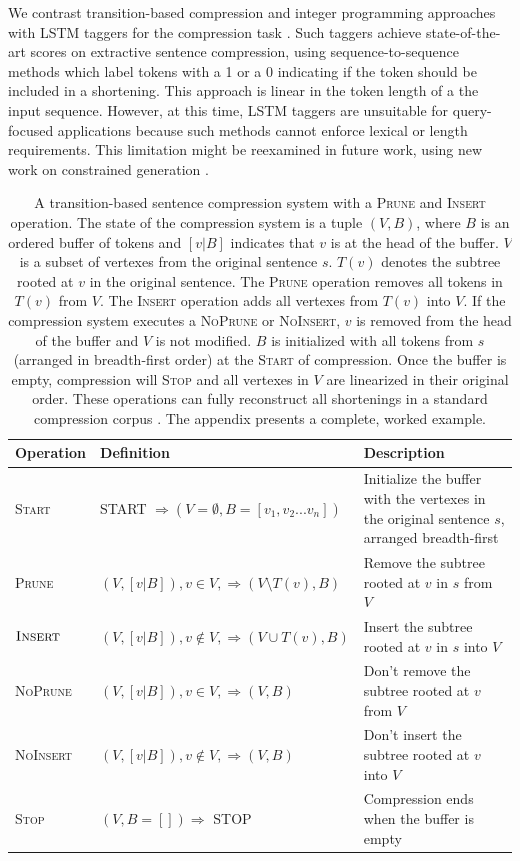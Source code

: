 \documentclass[11pt,a4paper]{article}
\begin{document}
We contrast transition-based compression and integer programming approaches with LSTM taggers for the compression task \cite{filippova2015sentence}. Such taggers achieve state-of-the-art scores on extractive sentence compression, using sequence-to-sequence methods which label tokens with a 1 or a 0 indicating if the token should be included in a shortening. This approach is linear in the token length of a the input sequence. However, at this time, LSTM taggers are unsuitable for query-focused applications because such methods cannot enforce lexical or length requirements. This limitation might be reexamined in future work, using new work on constrained generation \cite{N18-1119,aaimh}.


\begin{table}[]
\centering
\begin{tabular}{llp{70mm}}
\textbf{Operation} &             \textbf{Definition}                                                    &      \textbf{Description}    \\ \hline
\textsc{Start}      & START $\Rightarrow ( V=\emptyset,  B=[v_1, v_2 ... v_n])$ & Initialize the buffer with the vertexes in the original sentence $s$, arranged breadth-first \\ \hline
\textsc{Prune}              & $(V, [v|B]), v \in V,  \Rightarrow (V \setminus  T(v), B)$ & Remove the subtree rooted at $v$ in $s$ from $V$ \\  
$\textsc{Insert}$             & $(V, [v|B]), v \notin V, \Rightarrow (V \cup T(v), B)$ & Insert the subtree rooted at $v$ in $s$ into $V$  \\ \hline
\textsc{NoPrune}           & $(V, [v|B]), v \in V, \Rightarrow (V, B)$ & Don't remove the subtree rooted at $v$ from $V$  \\ 
\textsc{NoInsert}          &       $(V, [v|B]), v \notin V, \Rightarrow (V, B)$ &   Don't insert the subtree rooted at $v$ into $V$    \\ \hline
\textsc{Stop}             & $ (V, B=[]) \Rightarrow$ STOP & Compression ends when the buffer is empty \\                                               
\end{tabular}
\caption{A transition-based sentence compression system with a \textsc{Prune} and \textsc{Insert} operation. The state of the compression system is a tuple $(V, B)$, where $B$ is an ordered buffer of tokens and $[v|B]$ indicates that $v$ is at the head of the buffer. $V$ is a subset of vertexes from the original sentence $s$. $T(v)$ denotes the subtree rooted at $v$ in the original sentence. The \textsc{Prune} operation removes all tokens in $T(v)$ from $V$. The \textsc{Insert} operation adds all vertexes from $T(v)$ into $V$. If the compression system executes a \textsc{NoPrune} or \textsc{NoInsert}, $v$ is removed from the head of the buffer and $V$ is not modified. $B$ is initialized with all tokens from $s$ (arranged in breadth-first order) at the \textsc{Start} of compression. Once the buffer is empty, compression will \textsc{Stop} and all vertexes in $V$ are linearized in their original order. These operations can fully reconstruct all shortenings in a standard compression corpus \cite{filippova2013overcoming}. The appendix presents a complete, worked example.}

\end{table}
\end{document}
